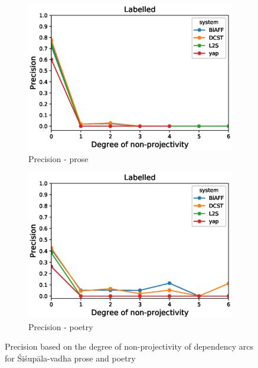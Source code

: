 \documentclass[11pt]{article}
\begin{document}
\begin{figure}[!ht]
        \centering
        \begin{subfigure}[b]{0.475\textwidth}
            \centering
            \includegraphics[width=\textwidth]{images/proseLabelledPrecDeg.eps}
            \caption[Network2]%
            {{\small Precision - prose}}    
        
        \end{subfigure}
        \hfill
        \begin{subfigure}[b]{0.475\textwidth}  
            \centering 
            \includegraphics[width=\textwidth]{images/poetryLabelledPrecDeg.eps}
            \caption[]%
            {{\small Precision - poetry}}    
            \label{xxxe}
        \end{subfigure}

        \caption[  Precision based on the degree of non-projectivity of dependency arcs for Śiśupāla-vadha prose and poetry]
        {\small  Precision based on the degree of non-projectivity of dependency arcs for Śiśupāla-vadha prose and poetry} 
        \label{nonProjProse}
    \end{figure} 
    
\end{document}
